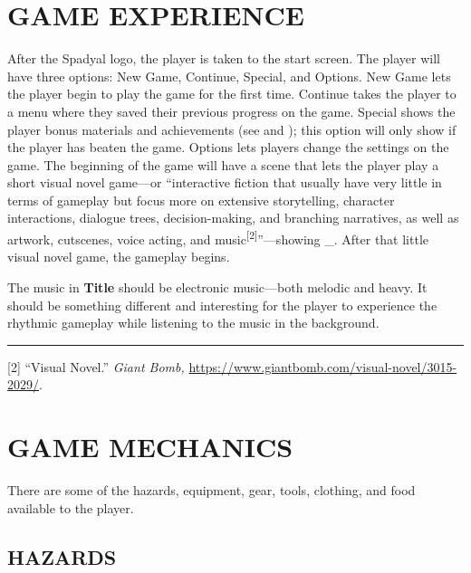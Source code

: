 \documentclass[11pt]{article}
\begin{document}
	\section*{GAME EXPERIENCE}
	After the Spadyal logo, the player is taken to the start screen. The player will have three options: New Game, Continue, Special, and Options. New Game lets the player begin to play the game for the first time. Continue takes the player to a menu where they saved their previous progress on the game. Special shows the player bonus materials and achievements (see  and ); this option will only show if the player has beaten the game. Options lets players change the settings on the game. \newline \newline
	\noindent The beginning of the game will have a scene that lets the player play a short visual novel game---or ``interactive fiction that usually have very little in terms of gameplay but focus more on extensive storytelling, character interactions, dialogue trees, decision-making, and branching narratives, as well as artwork, cutscenes, voice acting, and music\textsuperscript{[2]}''---showing \_. After that little visual novel game, the gameplay begins.
	\begin{center}
	\end{center}
	The music in \textbf{Title} should be electronic music---both melodic and heavy. It should be something different and interesting for the player to experience the rhythmic gameplay while listening to the music in the background.
	\vfill
	\hrule
	\vspace{0.25cm} %
	[2] ``Visual Novel.'' \textit{Giant Bomb,} \href{https://www.giantbomb.com/visual-novel/3015-2029/}{https://www.giantbomb.com/visual-novel/3015-2029/}.
	\newpage
	\section*{GAME MECHANICS}
	There are some of the hazards, equipment, gear, tools, clothing, and food available to the player.
	\subsection*{HAZARDS}
	
\end{document}
